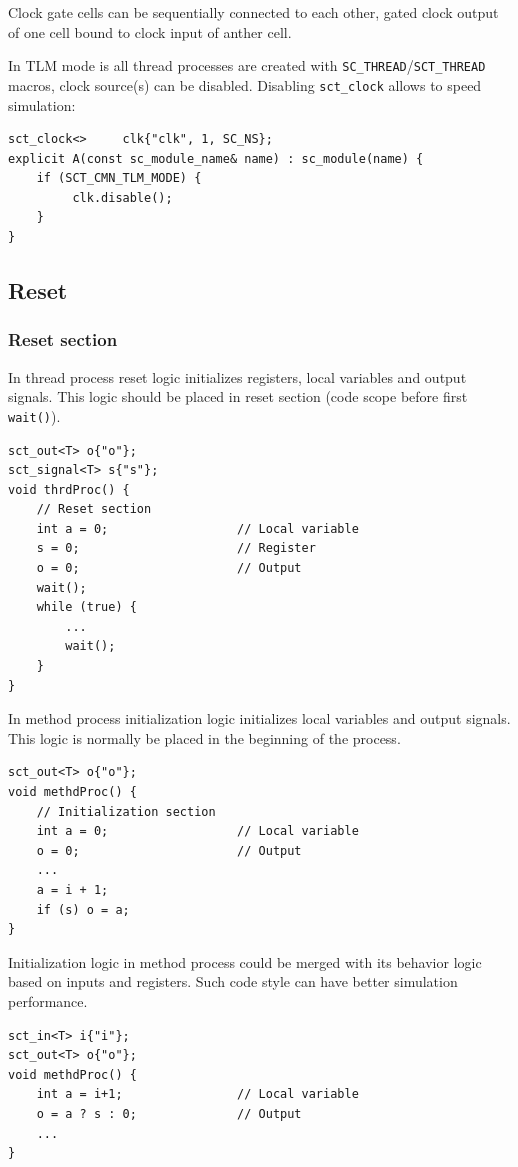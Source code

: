 Clock gate cells can be sequentially connected to each other, gated clock output of one cell bound to clock input of anther cell.

In TLM mode is all thread processes are created with {\tt SC\_THREAD}/{\tt SCT\_THREAD} macros, clock source(s) can be disabled. Disabling {\tt sct\_clock} allows to speed simulation:
\begin{lstlisting}[style=mycpp]
sct_clock<>     clk{"clk", 1, SC_NS};
explicit A(const sc_module_name& name) : sc_module(name) {
    if (SCT_CMN_TLM_MODE) {
         clk.disable();
    }
}
\end{lstlisting}

\subsection{Reset}

\subsubsection{Reset section}

In thread process reset logic initializes registers, local variables and output signals. This logic should be placed in reset section (code scope before first {\tt wait()}).
\begin{lstlisting}[style=mycpp]
sct_out<T> o{"o"};
sct_signal<T> s{"s"};
void thrdProc() {
    // Reset section
    int a = 0;                  // Local variable
    s = 0;                      // Register 
    o = 0;                      // Output 
    wait();
    while (true) {
        ...
        wait(); 
    } 
}
\end{lstlisting}

In method process initialization logic initializes local variables and output signals. This logic is normally be placed in the beginning of the process.
\begin{lstlisting}[style=mycpp]
sct_out<T> o{"o"};
void methdProc() {
    // Initialization section
    int a = 0;                  // Local variable
    o = 0;                      // Output 
    ...
    a = i + 1;
    if (s) o = a;
}
\end{lstlisting}

Initialization logic in method process could be merged with its behavior logic based on inputs and registers. Such code style can have better simulation performance.
\begin{lstlisting}[style=mycpp]
sct_in<T> i{"i"};
sct_out<T> o{"o"};
void methdProc() {
    int a = i+1;                // Local variable
    o = a ? s : 0;              // Output 
    ...
}
\end{lstlisting}

